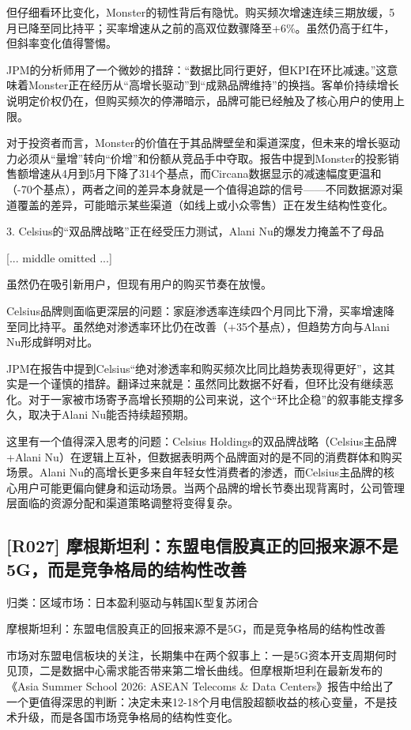 \documentclass[11pt]{ctexart}
\begin{document}
但仔细看环比变化，Monster的韧性背后有隐忧。购买频次增速连续三期放缓，5月已降至同比持平；买率增速从之前的高双位数骤降至+6\%。虽然仍高于红牛，但斜率变化值得警惕。

JPM的分析师用了一个微妙的措辞：“数据比同行更好，但KPI在环比减速。”这意味着Monster正在经历从“高增长驱动”到“成熟品牌维持”的换挡。客单价持续增长说明定价权仍在，但购买频次的停滞暗示，品牌可能已经触及了核心用户的使用上限。

对于投资者而言，Monster的价值在于其品牌壁垒和渠道深度，但未来的增长驱动力必须从“量增”转向“价增”和份额从竞品手中夺取。报告中提到Monster的投影销售额增速从4月到5月下降了314个基点，而Circana数据显示的减速幅度更温和（-70个基点），两者之间的差异本身就是一个值得追踪的信号——不同数据源对渠道覆盖的差异，可能暗示某些渠道（如线上或小众零售）正在发生结构性变化。

3. Celsius的“双品牌战略”正在经受压力测试，Alani Nu的爆发力掩盖不了母品

[... middle omitted ...]

虽然仍在吸引新用户，但现有用户的购买节奏在放慢。

Celsius品牌则面临更深层的问题：家庭渗透率连续四个月同比下滑，买率增速降至同比持平。虽然绝对渗透率环比仍在改善（+35个基点），但趋势方向与Alani Nu形成鲜明对比。

JPM在报告中提到Celsius“绝对渗透率和购买频次比同比趋势表现得更好”，这其实是一个谨慎的措辞。翻译过来就是：虽然同比数据不好看，但环比没有继续恶化。对于一家被市场寄予高增长预期的公司来说，这个“环比企稳”的叙事能支撑多久，取决于Alani Nu能否持续超预期。

这里有一个值得深入思考的问题：Celsius Holdings的双品牌战略（Celsius主品牌+Alani Nu）在逻辑上互补，但数据表明两个品牌面对的是不同的消费群体和购买场景。Alani Nu的高增长更多来自年轻女性消费者的渗透，而Celsius主品牌的核心用户可能更偏向健身和运动场景。当两个品牌的增长节奏出现背离时，公司管理层面临的资源分配和渠道策略调整将变得复杂。

\subsection{[R027] 摩根斯坦利：东盟电信股真正的回报来源不是5G，而是竞争格局的结构性改善}
{\small\color{refgray}归类：区域市场：日本盈利驱动与韩国K型复苏闭合}

摩根斯坦利：东盟电信股真正的回报来源不是5G，而是竞争格局的结构性改善

市场对东盟电信板块的关注，长期集中在两个叙事上：一是5G资本开支周期何时见顶，二是数据中心需求能否带来第二增长曲线。但摩根斯坦利在最新发布的《Asia Summer School 2026: ASEAN Telecoms \& Data Centers》报告中给出了一个更值得深思的判断：决定未来12-18个月电信股超额收益的核心变量，不是技术升级，而是各国市场竞争格局的结构性变化。
\end{document}
